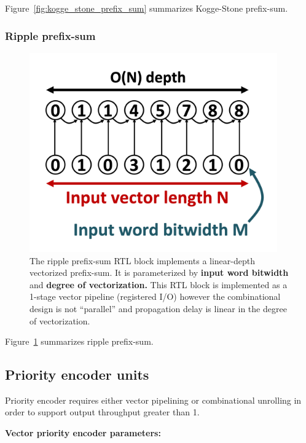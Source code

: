Figure~\ref{fig:kogge_stone_prefix_sum} summarizes Kogge-Stone prefix-sum.

\subsubsection{Ripple prefix-sum}


\begin{figure}[H]
    \centering
    \includegraphics[width=0.95\textwidth]{figures/ripple_prefix_sum.png}
    \caption{The ripple prefix-sum RTL block implements a linear-depth vectorized prefix-sum. It is parameterized by \textbf{input word bitwidth} and \textbf{degree of vectorization.} This RTL block is implemented as a 1-stage vector pipeline (registered I/O) however the combinational design is not ``parallel'' and propagation delay is linear in the degree of vectorization.}
    \label{fig:ripple_prefix_sum}
\end{figure}

Figure~\ref{fig:ripple_prefix_sum} summarizes ripple prefix-sum.

\subsection{Priority encoder units}

Priority encoder requires either vector pipelining or combinational unrolling in order to support output throughput greater than 1.

\textbf{Vector priority encoder parameters:}

